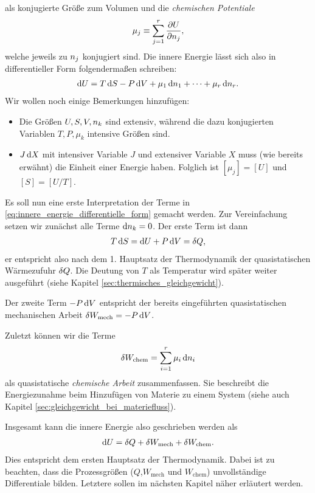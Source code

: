 als konjugierte Größe zum Volumen und die \emph{chemischen Potentiale}
\begin{align}
    \label{eq:def_chemische_potentiale}
    \mu_j \equiv \sum_{j = 1}^r \frac{\partial U}{\partial n_j},
\end{align}
welche jeweils zu $n_j$ konjugiert sind.
Die innere Energie lässt sich also in differentieller Form folgendermaßen schreiben:
\begin{align}
    \label{eq:innere_energie_differentielle_form}
    \mathop{}\!\mathrm{d} U = T\mathop{}\!\mathrm{d} S - P \mathop{}\!\mathrm{d} V + \mu_1 \mathop{}\!\mathrm{d} n_1 + \cdots + \mu_r \mathop{}\!\mathrm{d} n_r.
\end{align}
Wir wollen noch einige Bemerkungen hinzufügen:
\begin{itemize}
    \item Die Größen $U, S,V,n_k$ sind extensiv, während die dazu konjugierten Variablen $T,P,\mu_k$ intensive Größen sind.
    \item $J\mathop{}\!\mathrm{d} X$ mit intensiver Variable $J$ und extensiver Variable $X$ muss (wie bereits erwähnt) die Einheit einer Energie haben. Folglich ist $[\mu_j] = [U]$ und $[S]=[U/T]$.
\end{itemize}

Es soll nun eine erste Interpretation der Terme in \eqref{eq:innere_energie_differentielle_form} gemacht werden.
Zur Vereinfachung setzen wir zunächst alle Terme $\mathop{}\!\mathrm{d} n_k=0$.
Der erste Term ist dann
\begin{align*}
    T\mathop{}\!\mathrm{d} S = \mathop{}\!\mathrm{d} U+ P\mathop{}\!\mathrm{d} V = \mathop{}\!\delta Q,
\end{align*}
er entspricht also nach dem 1. Hauptsatz der Thermodynamik der quasistatischen Wärmezufuhr $\mathop{}\!\delta Q$.
Die Deutung von $T$ als Temperatur wird später weiter ausgeführt (siehe Kapitel \ref{sec:thermisches_gleichgewicht}).

Der zweite Term $-P\mathop{}\!\mathrm{d} V$ entspricht der bereits eingeführten quasistatischen mechanischen Arbeit $\mathop{}\!\delta W_\mathrm{mech}=-P\mathop{}\!\mathrm{d} V$.

Zuletzt können wir die Terme
\begin{align*}
    \mathop{}\!\delta W_\mathrm{chem} = \sum_{i = 1}^r \mu_i\mathop{}\!\mathrm{d} n_i
\end{align*}
als quasistatische \emph{chemische Arbeit} zusammenfassen. Sie beschreibt die Energiezunahme beim Hinzufügen von Materie zu einem System (siehe auch Kapitel \ref{sec:gleichgewicht_bei_materiefluss}).

Insgesamt kann die innere Energie also geschrieben werden als
\begin{align}
    \label{eq:erster_HS_TD}
    \mathop{}\!\mathrm{d} U = \mathop{}\!\delta Q + \mathop{}\!\delta W_\mathrm{mech} + \mathop{}\!\delta W_\mathrm{chem}.
\end{align}
Dies entspricht dem ersten Hauptsatz der Thermodynamik.
Dabei ist zu beachten, dass die Prozessgrößen ($Q$,$W_\mathrm{mech}$ und $W_\mathrm{chem}$) unvollständige Differentiale bilden. Letztere sollen im nächsten Kapitel näher erläutert werden.

